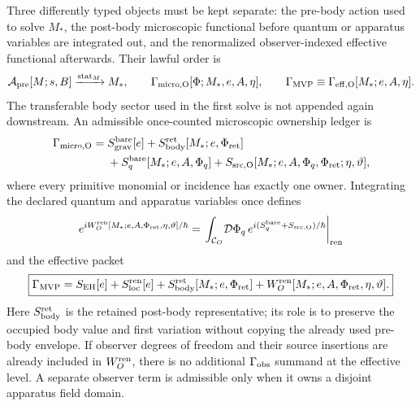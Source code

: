 \documentclass[11pt]{article}
\newcommand{\GMVP}{\Gamma_{\mathrm{MVP}}}
\begin{document}
Three differently typed objects must be kept separate: the pre-body action
used to solve \(M_*\), the post-body microscopic functional before quantum or
apparatus variables are integrated out, and the renormalized observer-indexed
effective functional afterwards.  Their lawful order is
\begin{equation}
 \mathcal A_{\rm pre}[M;s,B]
 \xrightarrow{\operatorname{stat}_M}M_*,
 \qquad
 \Gamma_{\rm micro,O}[\Phi;M_*,e,A,\eta],
 \qquad
 \GMVP\equiv\Gamma_{\rm eff,O}[M_*;e,A,\eta].
 \label{eq:mvp-functional-order}
\end{equation}
The transferable body sector used in the first solve is not appended again
downstream.  An admissible once-counted microscopic ownership ledger is
\begin{align}
 \Gamma_{\rm micro,O}={}&S_{\rm grav}^{\rm bare}[e]
 +S_{\rm body}^{\rm ret}[M_*;e,\Phi_{\rm ret}]\nonumber\\
 &+S_q^{\rm bare}[M_*;e,A,\Phi_q]
 +S_{\rm src,O}[M_*;e,A,\Phi_q,\Phi_{\rm ret};\eta,\vartheta],
 \label{eq:mvp-microscopic-ledger}
\end{align}
where every primitive monomial or incidence has exactly one owner.
Integrating the declared quantum and apparatus variables once defines
\begin{equation}
 e^{iW_O^{\rm ren}[M_*;e,A,\Phi_{\rm ret},\eta,\vartheta]/\hbar}
 =\left.\int_{\mathcal C_O}\!\mathcal D\Phi_q\,
 e^{i(S_q^{\rm bare}+S_{\rm src,O})/\hbar}\right|_{\rm ren}
 \label{eq:mvp-integrated-observer-functional}
\end{equation}
and the effective packet
\begin{equation}
 \boxed{
 \GMVP=S_{\rm EH}[e]+S_{\rm loc}^{\rm ren}[e]
 +S_{\rm body}^{\rm ret}[M_*;e,\Phi_{\rm ret}]
 +W_O^{\rm ren}[M_*;e,A,\Phi_{\rm ret},\eta,\vartheta].}
 \label{eq:mvp-functional}
\end{equation}
Here \(S_{\rm body}^{\rm ret}\) is the retained post-body representative; its
role is to preserve the occupied body value and first variation without
copying the already used pre-body envelope.  If observer degrees of freedom and their
source insertions are already included in \(W_O^{\rm ren}\), there is no
additional \(\Gamma_{\rm obs}\) summand at the effective level.  A separate
observer term is admissible only when it owns a disjoint apparatus field
domain.
\end{document}
